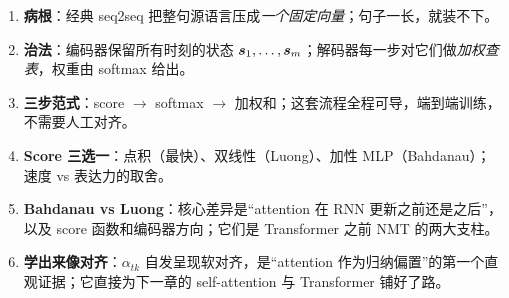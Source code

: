 \begin{keypointblock}
\begin{enumerate}
  \item \textbf{病根}：经典 seq2seq 把整句源语言压成\emph{一个固定向量}；句子一长，就装不下。
  \item \textbf{治法}：编码器保留所有时刻的状态 $\boldsymbol{s}_1,\ldots,\boldsymbol{s}_m$；解码器每一步对它们做\emph{加权查表}，权重由 softmax 给出。
  \item \textbf{三步范式}：score $\to$ softmax $\to$ 加权和；这套流程全程可导，端到端训练，不需要人工对齐。
  \item \textbf{Score 三选一}：点积（最快）、双线性（Luong）、加性 MLP（Bahdanau）；速度 vs 表达力的取舍。
  \item \textbf{Bahdanau vs Luong}：核心差异是“attention 在 RNN 更新之前还是之后”，以及 score 函数和编码器方向；它们是 Transformer 之前 NMT 的两大支柱。
  \item \textbf{学出来像对齐}：$\alpha_{tk}$ 自发呈现软对齐，是“attention 作为归纳偏置”的第一个直观证据；它直接为下一章的 self-attention 与 Transformer 铺好了路。
\end{enumerate}
\end{keypointblock}
